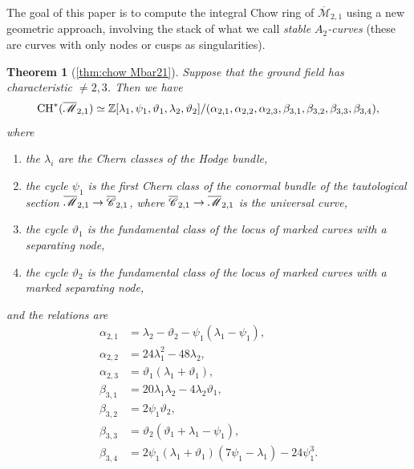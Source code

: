 \documentclass[a4paper, 10pt]{amsart}
\numberwithin{equation}{section}
\numberwithin{subsection}{section}
\newenvironment{enumeratea}
{\begin{enumerate}[\upshape (a)]}
	{\end{enumerate}}
\newtheorem*{maintheorem}{Theorem}
\theoremstyle{definition}
\theoremstyle{remark}
\renewcommand{\mathcal}{\mathscr}
\newcommand\cC{\mathcal{C}} \newcommand\cD{\mathcal{D}}
\newcommand\cM{\mathcal{M}} \newcommand\cN{\mathcal{N}}
\newcommand\arr{\ifinner\to\else\longrightarrow\fi}
\newcommand{\Mbar}{\overline{\cM}}
\newcommand{\Cbar}{\overline{\cC}}
\newcommand{\ch}[1][*]{\operatorname{CH}^{#1}}
\begin{document}
	The goal of this paper is to compute the integral Chow ring of $\Mbar_{2,1}$ using a new geometric approach, involving  the stack of what we call \emph{stable $A_2$-curves} (these are curves with only nodes or cusps as singularities).
	
	\begin{maintheorem}[\ref{thm:chow Mbar21}]
		Suppose that the ground field has characteristic $\neq 2,3$. Then we have
		\[ \ch(\Mbar_{2,1})\simeq \ZZ[\lambda_1,\psi_1,\vartheta_1,\lambda_2,\vartheta_2]/(\alpha_{2,1},\alpha_{2,2}, \alpha_{2,3}, \beta_{3,1}, \beta_{3,2}, \beta_{3,3}, \beta_{3,4}), \]
		where
		\begin{enumeratea}
			
			\item the $\lambda_i$ are the Chern classes of the Hodge bundle,
			
			\item the cycle $\psi_{1}$ is the first Chern class of the conormal bundle of the tautological section $\Mbar_{2, 1} \arr \Cbar_{2,1}$, where $\Cbar_{2,1} \arr \Mbar_{2,1}$ is the universal curve,
			
			\item the cycle $\vartheta_1$ is the fundamental class of the locus of marked curves with a separating node, 
			
			\item the cycle $\vartheta_2$ is the fundamental class of the locus of marked curves with a marked separating node,
			
		\end{enumeratea}
		
		and the relations are
		\begin{align*}
			\alpha_{2,1}&=\lambda_2-\vartheta_2-\psi_1(\lambda_1-\psi_1),\\
			\alpha_{2,2}&=24\lambda_1^2-48\lambda_2,\\
			\alpha_{2,3}&=\vartheta_1(\lambda_1+\vartheta_1),\\
			\beta_{3,1}&=20\lambda_1\lambda_2-4\lambda_2\vartheta_1,\\
			\beta_{3,2}&=2\psi_1\vartheta_2,\\
			\beta_{3,3}&=\vartheta_2(\vartheta_1+\lambda_1-\psi_1),\\
			\beta_{3,4}&=2\psi_1(\lambda_1 +\vartheta_1)(7\psi_1-\lambda_1) - 24\psi_1^3.\\
		\end{align*}
	\end{maintheorem}
	
\end{document}

